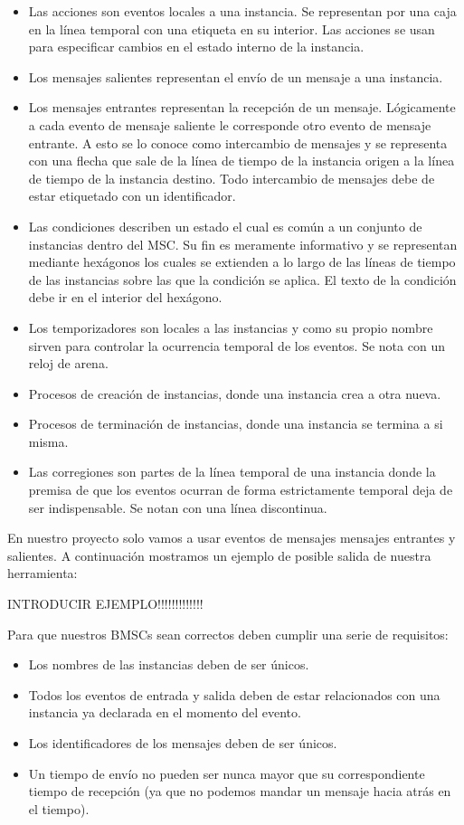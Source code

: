 \documentclass[12pt,a4paper]{report}
\begin{document}
\begin{itemize}
\item Las acciones son eventos locales a una instancia. Se representan por una caja en la línea temporal con una etiqueta en su interior. Las acciones se usan para especificar cambios en el estado interno de la instancia.
\item Los mensajes salientes representan el envío de un mensaje a una instancia.
\item Los mensajes entrantes representan la recepción de un mensaje. Lógicamente a cada evento de mensaje saliente le corresponde otro evento de mensaje entrante. A esto se lo conoce como intercambio de mensajes y se representa con una flecha que sale de la línea de tiempo de la instancia origen a la línea de tiempo de la instancia destino. Todo intercambio de mensajes debe de estar etiquetado con un identificador. 
\item Las condiciones describen un estado el cual es común a un conjunto de instancias dentro del MSC. Su fin es meramente informativo y se representan mediante hexágonos los cuales se extienden a lo largo de las líneas de tiempo de las instancias sobre las que la condición se aplica. El texto de la condición debe ir en el interior del hexágono.
\item Los temporizadores son locales a las instancias y como su propio nombre sirven para controlar la ocurrencia temporal de los eventos. Se nota con un reloj de arena.
\item Procesos de creación de instancias, donde una instancia crea a otra nueva.
\item Procesos de terminación de instancias, donde una instancia se termina a si misma.
\item Las corregiones son partes de la línea temporal de una instancia donde la premisa de que los eventos ocurran de forma estrictamente temporal deja de ser indispensable. Se notan con una línea discontinua.
\end{itemize}

En nuestro proyecto solo vamos a usar eventos de mensajes mensajes entrantes y salientes. A continuación mostramos un ejemplo de posible salida de nuestra herramienta:

INTRODUCIR EJEMPLO!!!!!!!!!!!!!

Para que nuestros BMSCs sean correctos deben cumplir una serie de requisitos:
\begin{itemize}
\item Los nombres de las instancias deben de ser únicos.
\item Todos los eventos de entrada y salida deben de estar relacionados con una instancia ya declarada en el momento del evento.
\item Los identificadores de los mensajes deben de ser únicos.
\item Un tiempo de envío no pueden ser nunca mayor que su correspondiente tiempo de recepción (ya que no podemos mandar un mensaje hacia atrás en el tiempo).
\end{itemize}
\end{document}
